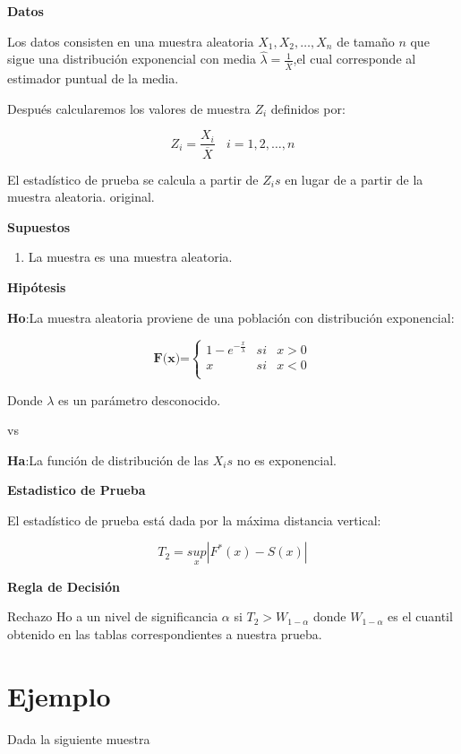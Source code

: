 \documentclass[a4paper,oneside,openany]{book}
\providecommand{\tightlist}{%
  \setlength{\itemsep}{0pt}\setlength{\parskip}{0pt}}
\begin{document}
\textbf{Datos}

Los datos consisten en una muestra aleatoria
\(X_{1},X_{2},\ldots,X_{n}\) de tamaño \(n\) que sigue una distribución
exponencial con media \(\hat{\lambda} = \frac{1}{\overline{X}}\),el cual
corresponde al estimador puntual de la media.

Después calcularemos los valores de muestra \(Z_{i}\) definidos por:

\[Z_{i}=\frac{X_{i}}{\overline{X}} \ \ \ \ i=1,2,\ldots,n\]

El estadístico de prueba se calcula a partir de \(Z_{i}s\) en lugar de a
partir de la muestra aleatoria. original.

\textbf{Supuestos}

\begin{enumerate}
\def\labelenumi{\arabic{enumi})}
\tightlist
\item
  La muestra es una muestra aleatoria.
\end{enumerate}

\textbf{Hipótesis}

\textbf{Ho}:La muestra aleatoria proviene de una población con
distribución exponencial:

\[
\textbf{F(x)=} \left\{
\begin{array}{lcc}
1-e^{-\frac{x}{\lambda}} & si & x > 0 \\
x & si &  x < 0 \\
\end{array}
\right.
\]

Donde \(\lambda\) es un parámetro desconocido.

vs

\textbf{Ha}:La función de distribución de las \(X_{i}s\) no es
exponencial.

\textbf{Estadistico de Prueba}

El estadístico de prueba está dada por la máxima distancia vertical:

\[T_{2}=\underset{x}{sup}|F^*(x)-S(x)|\]

\textbf{Regla de Decisión}

Rechazo Ho a un nivel de significancia \(\alpha\) si
\(T_{2}> W_{1-\alpha}\) donde \(W_{1-\alpha}\) es el cuantil obtenido en
las tablas correspondientes a nuestra prueba.

\section{Ejemplo}\label{ejemplo-14}

Dada la siguiente muestra
\end{document}
